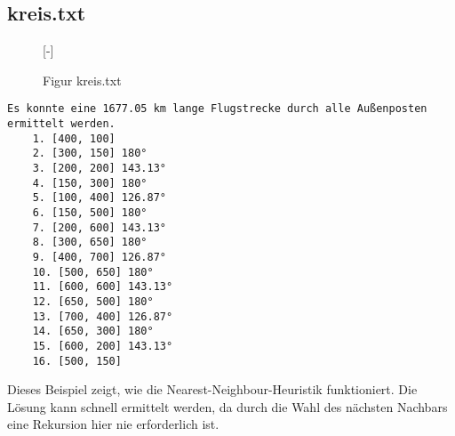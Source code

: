 \documentclass[a4paper,10pt,ngerman]{scrartcl}
\begin{document}
    \subsection{kreis.txt}\label{subsec:kreis.txt}


    \begin{figure}[H]
        [-]
        \FigurFuenf{}
        \caption{Figur kreis.txt}
        \label{fig:Figure2}
    \end{figure}

    \begin{lstlisting}[frame=single, title=Programmausgabe kreis.txt, breaklines=true,label={lst:lstlisting}]
    Es konnte eine 1677.05 km lange Flugstrecke durch alle Außenposten ermittelt werden.
    1. [400, 100]
    2. [300, 150] 180°
    3. [200, 200] 143.13°
    4. [150, 300] 180°
    5. [100, 400] 126.87°
    6. [150, 500] 180°
    7. [200, 600] 143.13°
    8. [300, 650] 180°
    9. [400, 700] 126.87°
    10. [500, 650] 180°
    11. [600, 600] 143.13°
    12. [650, 500] 180°
    13. [700, 400] 126.87°
    14. [650, 300] 180°
    15. [600, 200] 143.13°
    16. [500, 150]
    \end{lstlisting}

    Dieses Beispiel zeigt, wie die Nearest-Neighbour-Heuristik funktioniert.
    Die Lösung kann schnell ermittelt werden, da durch die Wahl des nächsten Nachbars eine Rekursion hier nie erforderlich ist.
\end{document}
